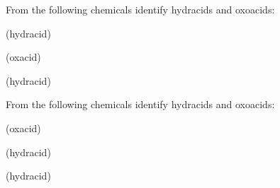 \documentclass[main.tex]{subfiles}
\begin{document}
\begin{multicols*}{2}
\begin{question}[ID=\the\value{numA}]
From the following chemicals identify hydracids and oxoacids:
\begin{inparaenum}[(a)]
\item {}		%
\item {}	%
\item {}		%
\end{inparaenum}
\end{question}
\begin{solution}
\begin{inparaenum}[(a)]
\item {}		(hydracid)
\item {}	(oxacid)
\item {}		(hydracid)
 \end{inparaenum}\hspace{0.1cm}\end{solution}
\begin{question}[ID=\the\value{numA}]
From the following chemicals identify hydracids and oxoacids:
\begin{inparaenum}[(a)]
\item {}	%
\item {}		%
\item {}		%
\end{inparaenum}
\end{question}
\begin{solution}
\begin{inparaenum}[(a)]
\item {}	(oxacid)
\item {}		(hydracid)
\item {}		(hydracid)
 \end{inparaenum}\hspace{0.1cm}\end{solution}



\end{multicols*}
\end{document}
